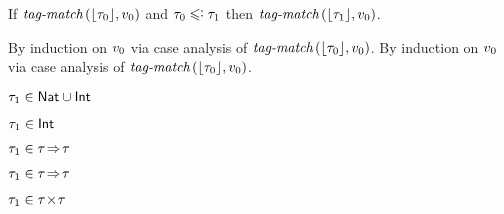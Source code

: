 \begin{lemma}\label{A-compat-subt}
  If\/ $\textit{tag-match}\,(\lfloor \tau_0 \rfloor,v_0)$
  and\/ $\stype_0 \subteq \stype_1$
  then\/ $\textit{tag-match}\,(\lfloor \tau_1 \rfloor,v_0)$.
\end{lemma}{
  \newcommand{\shortpf}{By induction on $\svalue_0$ via case analysis of $\fshallow{\tagof{\stype_0}}{\svalue_0}$.}
\begin{lamportproof*}
  \shortpf
\mainproof
  \shortpf

    \begin{pfproof}
      \qedstep
        \begin{pfproof}
          {$\tau_1 \in \mathsf{Nat} \cup \mathsf{Int}$}
        \end{pfproof}
    \end{pfproof}

    \begin{pfproof}
      \qedstep
        \begin{pfproof}
          {$\tau_1 \in \mathsf{Int}$}
        \end{pfproof}
    \end{pfproof}

    \begin{pfproof}
      \qedstep
        \begin{pfproof}
          {$\tau_1 \in \tau\!\Rightarrow\!\tau$}
        \end{pfproof}
    \end{pfproof}

    \begin{pfproof}
      \qedstep
        \begin{pfproof}
          {$\tau_1 \in \tau\!\Rightarrow\!\tau$}
        \end{pfproof}
    \end{pfproof}

    \begin{pfproof}
      \qedstep
        \begin{pfproof}
          {$\tau_1 \in \tau\!\times\!\tau$}
        \end{pfproof}
    \end{pfproof}


\end{lamportproof*}}
